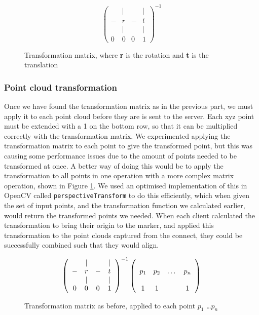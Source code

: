 \documentclass{article}
\begin{document}
\begin{figure}[h]
  \[\left(\begin{array}{cccc}
      & | &   & | \\
    - & r & - & t \\ 
      & | &   & | \\
    0 & 0 & 0 & 1
    \end{array}\right)^{-1}\]
  \caption{Transformation matrix, where \textbf{r} is the rotation and \textbf{t} is the translation}
  \label{fig:transformationMatrix}
\end{figure}
\subsubsection{Point cloud transformation}
Once we have found the transformation matrix as in the previous part, we must apply it to each point cloud before they are is sent to the server. Each xyz point must be extended with a 1 on the bottom row, so that it can be multiplied correctly with the transformation matrix. We experimented applying the transformation matrix to each point to give the transformed point, but this was causing some performance issues due to the amount of points needed to be transformed at once. A better way of doing this would be to apply the transformation to all points in one operation with a more complex matrix operation, shown in Figure \ref{fig:transformationMatrix}. We used an optimised implementation of this in OpenCV called \texttt{perspectiveTransform} to do this efficiently, which when given the set of input points, and the transformation function we calculated earlier, would return the transformed points we needed. When each client calculated the transformation to bring their origin to the marker, and applied this transformation to the point clouds captured from the connect, they could be successfully combined such that they would align.\\
\begin{figure}[h]
  \[\left(\begin{array}{cccc}
      & | &   & | \\
    - & r & - & t \\ 
      & | &   & | \\
    0 & 0 & 0 & 1
    \end{array}\right)^{-1}
  \left(\begin{array}{cccc}
    \multirow{3}{*}{\textbf{$p_1$}} & \multirow{3}{*}{\textbf{$p_2$}} & \multirow{3}{*}{\dots} & \multirow{3}{*}{\textbf{$p_n$}} \\
    & & & \\
    & & & \\
    1 & 1 & & 1
    \end{array}\right)\]
  \caption{Transformation matrix as before, applied to each point $p_1$ \dots $p_n$}
  \label{fig:transformationApplication}
\end{figure}
\end{document}
